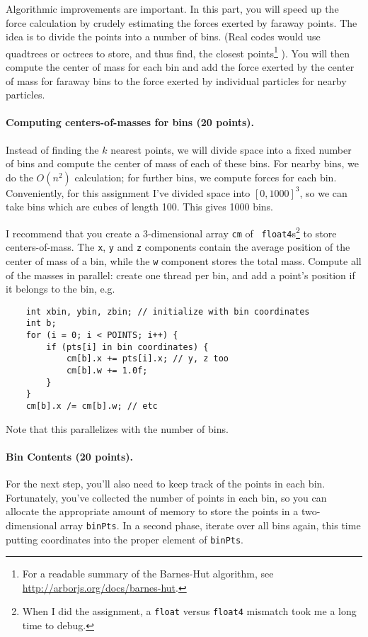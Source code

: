 \documentclass[letterpaper,10pt]{article}
\begin{document}
Algorithmic improvements are important. In this part, you will
speed up the force calculation by crudely estimating the forces
exerted by faraway points. The idea is to divide the points into a
number of bins. (Real codes would use quadtrees or octrees to store,
and thus find, the closest points\footnote{For a readable summary
of the Barnes-Hut algorithm, see \url{http://arborjs.org/docs/barnes-hut}.}
). You will then compute the center
of mass for each bin and add the force exerted by the center of mass
for faraway bins to the force exerted by individual particles for
nearby particles.

\paragraph{Computing centers-of-masses for bins (20 points).}
Instead of finding the $k$ nearest points, we will divide space into a
fixed number of bins and compute the center of mass of each of these
bins. For nearby bins, we do the $O(n^2)$ calculation; for further
bins, we compute forces for each bin. Conveniently, for this assignment
I've divided space into $[0, 1000]^3$, so we can take bins which are
cubes of length 100. This gives 1000 bins.

I recommend that you create a 3-dimensional array {\tt cm} of {\tt
  float4}s\footnote{When I did the assignment, a {\tt float} versus {\tt float4}
mismatch took me a long time to debug.} to store centers-of-mass. The {\tt x}, {\tt y} and {\tt z}
components contain the average position of the center of mass of a
bin, while the {\tt w} component stores the total mass. Compute all of
the masses in parallel: create one thread per bin, and add a point's
position if it belongs to the bin, e.g.

{\small
\begin{verbatim}
    int xbin, ybin, zbin; // initialize with bin coordinates
    int b;
    for (i = 0; i < POINTS; i++) {
        if (pts[i] in bin coordinates) {
            cm[b].x += pts[i].x; // y, z too
            cm[b].w += 1.0f;
        }
    }
    cm[b].x /= cm[b].w; // etc
\end{verbatim}
}

\noindent
Note that this parallelizes with the number of bins.

\paragraph{Bin Contents (20 points).}
For the next step, you'll also need to keep track of the points in
each bin. Fortunately, you've collected the number of points in each
bin, so you can allocate the appropriate amount of memory to store the
points in a two-dimensional array {\tt binPts}. In a second phase,
iterate over all bins again, this time putting coordinates into the
proper element of {\tt binPts}.
\end{document}
